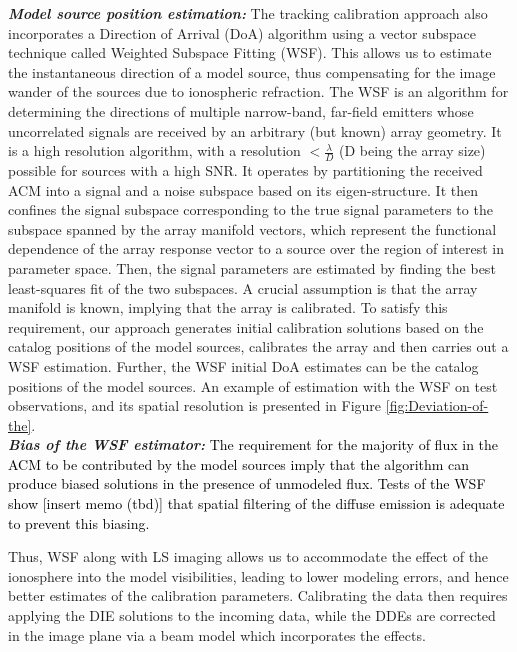 \documentclass{aa}
\begin{document}
\textbf{\emph{Model   source    position   estimation:}}\emph{   }The   tracking
calibration approach  also incorporates a  Direction of Arrival  (DoA) algorithm
using   a   vector  subspace   technique   called   Weighted  Subspace   Fitting
(WSF)\citep{viberg1991detection}. This  allows us to  estimate the instantaneous
direction  of a  model source,  thus compensating  for the  image wander  of the
sources due to  ionospheric refraction. The WSF is  an algorithm for determining
the directions  of multiple  narrow-band, far-field emitters  whose uncorrelated
signals are  received by an arbitrary (but  known) array geometry. It  is a high
resolution algorithm, with a  resolution $<\frac{\lambda}{D}$ (D being the array
size) possible  for sources  with a  high SNR. It  operates by  partitioning the
received ACM  into a signal and  a noise subspace based  on its eigen-structure.
It then confines the signal subspace corresponding to the true signal parameters
to  the subspace  spanned by  the array  manifold vectors,  which  represent the
functional dependence of  the array response vector to a  source over the region
of interest  in parameter  space. Then, the  signal parameters are  estimated by
finding the best least-squares fit of the two subspaces. A crucial assumption is
that the  array manifold  is known,  implying that the  array is  calibrated. To
satisfy this  requirement, our approach generates  initial calibration solutions
based on  the catalog positions of  the model sources, calibrates  the array and
then carries out a WSF estimation. Further, the WSF initial DoA estimates can be
the catalog  positions of the model  sources. An example of  estimation with the
WSF  on test observations,  and its  spatial resolution  is presented  in Figure
\ref{fig:Deviation-of-the}.\\   \textbf{\emph{Bias  of   the   WSF  estimator:}}
\textcolor{black}{The  requirement for the  majority of  flux in  the ACM  to be
  contributed by the  model sources imply that the  algorithm can produce biased
  solutions in the  presence of unmodeled flux. Tests of  the WSF show {[}insert
    memo (tbd){]} that spatial filtering  of the diffuse emission is adequate to
  prevent this biasing.}

Thus,  WSF along with  LS imaging  allows us  to accommodate  the effect  of the
ionosphere into  the model visibilities,  leading to lower modeling  errors, and
hence better estimates of the calibration parameters.  Calibrating the data then
requires applying  the DIE solutions  to the incoming  data, while the  DDEs are
corrected in the image plane via a beam model which incorporates the effects.
\end{document}
